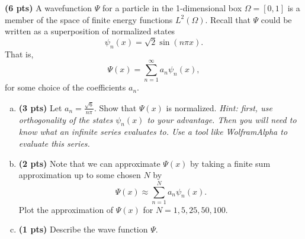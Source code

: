 \documentclass[12pt]{article} %
\begin{document}
\vspace*{1cm}
\begin{problem}
\textbf{(6 pts)} A wavefunction $\Psi$ for a particle in the 1-dimensional box $\Omega=[0,1]$ is a member of the space of finite energy functions $L^2(\Omega)$. Recall that $\Psi$ could be written as a superposition of normalized states
	\[
	\psi_n(x) = \sqrt{2} \sin\left(n\pi x\right).
	\]
	That is,
	\[
	\Psi(x) = \sum_{n=1}^\infty a_n \psi_n(x),
	\]
	for some choice of the coefficients $a_n$.
	\begin{enumerate}[(a)]
		\item \textbf{(3 pts)} Let $a_n = \frac{\sqrt{6}}{n\pi}$. Show that $\Psi(x)$ is normalized. \emph{Hint: first, use orthogonality of the states $\psi_n(x)$ to your advantage. Then you will need to know what an infinite series evaluates to. Use a tool like WolframAlpha to evaluate this series.}
		\item \textbf{(2 pts)} Note that we can approximate $\Psi(x)$ by taking a finite sum approximation up to some chosen $N$ by
		\[
			\Psi(x) \approx \sum_{n=1}^N a_n \psi_n(x).
		\]
		Plot the approximation of $\Psi(x)$ for $N=1,5,25,50,100$.  
\item \textbf{(1 pts)} Describe the wave function $\Psi$.
		\end{enumerate}
\end{problem}
\end{document}
